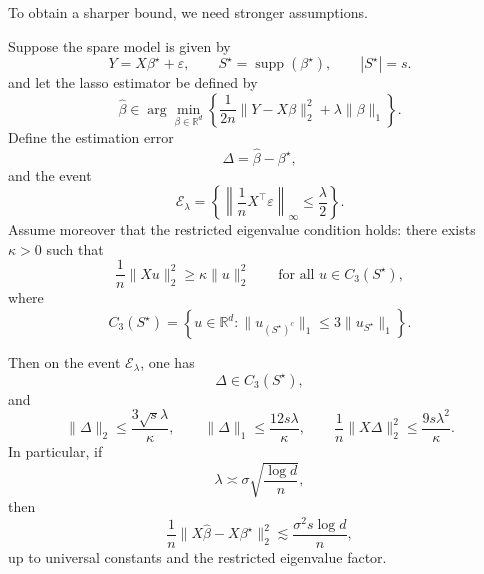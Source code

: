 To obtain a sharper bound, we need stronger assumptions.

\begin{prop}
Suppose the spare model is given by
\[
Y=X\beta^\star+\varepsilon,\qquad S^\star=\operatorname{supp}(\beta^\star),
\qquad |S^\star|=s.
\]
and let the lasso estimator be defined by
\[
\hat\beta \in \arg\min_{\beta\in\mathbb{R}^d}
\left\{
\frac{1}{2n}\|Y-X\beta\|_2^2+\lambda\|\beta\|_1
\right\}.
\]
Define the estimation error
\[
\Delta=\hat\beta-\beta^\star,
\]
and the event
\[
\mathcal E_\lambda
=
\left\{
\left\|\frac{1}{n}X^\top\varepsilon\right\|_\infty\le \frac{\lambda}{2}
\right\}.
\]
Assume moreover that the restricted eigenvalue condition holds: there exists \(\kappa>0\) such that
\[
\frac{1}{n}\|Xu\|_2^2 \ge \kappa \|u\|_2^2
\qquad \text{for all } u\in C_3(S^\star),
\]
where
\[
C_3(S^\star)
=
\left\{
u\in\mathbb{R}^d:
\|u_{(S^\star)^c}\|_1\le 3\|u_{S^\star}\|_1
\right\}.
\]

Then on the event \(\mathcal E_\lambda\), one has
\[
\Delta\in C_3(S^\star),
\]
and
\[
\|\Delta\|_2 \le \frac{3\sqrt{s}\lambda}{\kappa},
\qquad
\|\Delta\|_1 \le \frac{12 s\lambda}{\kappa},
\qquad
\frac{1}{n}\|X\Delta\|_2^2 \le \frac{9 s\lambda^2}{\kappa}.
\]
In particular, if
\[
\lambda \asymp \sigma \sqrt{\frac{\log d}{n}},
\]
then
\[
\frac{1}{n}\|X\hat\beta-X\beta^\star\|_2^2
\lesssim
\frac{\sigma^2 s\log d}{n},
\]
up to universal constants and the restricted eigenvalue factor.
\end{prop}

